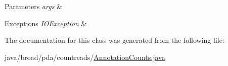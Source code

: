 \begin{DoxyParams}{Parameters}
{\em args} & \\
\hline
\end{DoxyParams}

\begin{DoxyExceptions}{Exceptions}
{\em I\+O\+Exception} & \\
\hline
\end{DoxyExceptions}


The documentation for this class was generated from the following file\+:\begin{DoxyCompactItemize}
\item 
java/broad/pda/countreads/\hyperlink{_annotation_counts_8java}{Annotation\+Counts.\+java}\end{DoxyCompactItemize}
